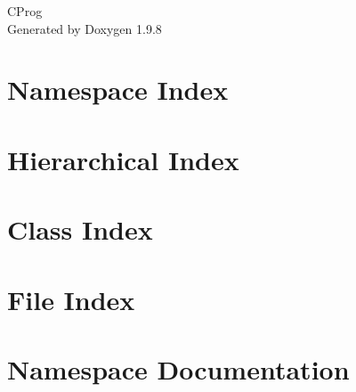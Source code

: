 \documentclass[twoside]{book}
\newcommand{\+}{\discretionary{\mbox{\scriptsize$\hookleftarrow$}}{}{}}
\newcommand{\clearemptydoublepage}{%
    \newpage{\pagestyle{empty}\cleardoublepage}%
  }
\begin{document}
  \raggedbottom
    \hypersetup{pageanchor=false,
                bookmarksnumbered=true,
                pdfencoding=unicode
               }
  \begin{titlepage}
  \vspace*{7cm}
  \begin{center}%
  {\Large CProg}\\
  \vspace*{1cm}
  {\large Generated by Doxygen 1.9.8}\\
  \end{center}
  \end{titlepage}
  \clearemptydoublepage
  \tableofcontents
  \clearemptydoublepage
  \hypersetup{pageanchor=true}





\chapter{Namespace Index}

\chapter{Hierarchical Index}

\chapter{Class Index}

\chapter{File Index}

\chapter{Namespace Documentation}



\end{document}
